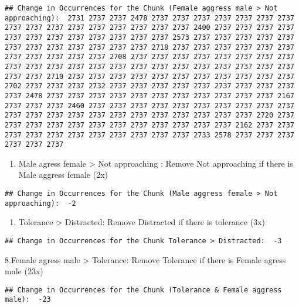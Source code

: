 \documentclass[
]{article}
\providecommand{\tightlist}{%
  \setlength{\itemsep}{0pt}\setlength{\parskip}{0pt}}
\begin{document}
\begin{verbatim}
## Change in Occurrences for the Chunk (Female aggress male > Not approaching):  2731 2737 2737 2478 2737 2737 2737 2737 2737 2737 2737 2737 2737 2737 2737 2737 2737 2737 2737 2737 2400 2737 2737 2737 2737 2737 2737 2737 2737 2737 2737 2737 2737 2573 2737 2737 2737 2737 2737 2737 2737 2737 2737 2737 2737 2737 2718 2737 2737 2737 2737 2737 2737 2737 2737 2737 2737 2737 2708 2737 2737 2737 2737 2737 2737 2737 2737 2737 2737 2737 2737 2737 2737 2737 2737 2737 2737 2737 2737 2737 2737 2737 2737 2710 2737 2737 2737 2737 2737 2737 2737 2737 2737 2737 2737 2702 2737 2737 2737 2732 2737 2737 2737 2737 2737 2737 2737 2737 2737 2737 2478 2737 2737 2737 2737 2737 2737 2737 2737 2737 2737 2737 2167 2737 2737 2737 2460 2737 2737 2737 2737 2737 2737 2737 2737 2737 2737 2737 2737 2737 2737 2737 2737 2737 2737 2737 2737 2737 2737 2720 2737 2737 2737 2737 2737 2737 2737 2737 2737 2737 2737 2737 2162 2737 2737 2737 2737 2737 2737 2737 2737 2737 2737 2737 2733 2578 2737 2737 2737 2737 2737 2737
\end{verbatim}

\begin{enumerate}
\def\labelenumi{\arabic{enumi}.}
\setcounter{enumi}{5}
\tightlist
\item
  Male agress female \textgreater{} Not approaching : Remove Not
  approaching if there is Male aggress female (2x)
\end{enumerate}

\begin{verbatim}
## Change in Occurrences for the Chunk (Male aggress female > Not approaching):  -2
\end{verbatim}

\begin{enumerate}
\def\labelenumi{\arabic{enumi}.}
\setcounter{enumi}{6}
\tightlist
\item
  Tolerance \textgreater{} Distracted: Remove Distracted if there is
  tolerance (3x)
\end{enumerate}

\begin{verbatim}
## Change in Occurrences for the Chunk Tolerance > Distracted:  -3
\end{verbatim}

8.Female agress male \textgreater{} Tolerance: Remove Tolerance if there
is Female agress male (23x)

\begin{verbatim}
## Change in Occurrences for the Chunk (Tolerance & Female aggress male):  -23
\end{verbatim}
\end{document}
